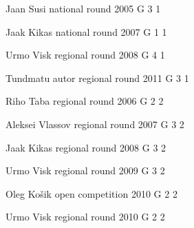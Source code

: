 \documentclass[11pt]{article}
\begin{document}
\ylDisplay{} %
{Jaan Susi} %
{national round} %
{2005} %
{G 3} %
{1} %
{

\ifEngSolution
\fi
}

\ylDisplay{} %
{Jaak Kikas} %
{national round} %
{2007} %
{G 1} %
{1} %
{

\ifEngSolution
\fi
}

\ylDisplay{} %
{Urmo Visk} %
{regional round} %
{2008} %
{G 4} %
{1} %
{

\ifEngSolution
\fi
}

\ylDisplay{} %
{Tundmatu autor} %
{regional round} %
{2011} %
{G 3} %
{1} %
{

\ifEngSolution
\fi
}

\ylDisplay{} %
{Riho Taba} %
{regional round} %
{2006} %
{G 2} %
{2} %
{

\ifEngSolution
\fi
}

\ylDisplay{} %
{Aleksei Vlassov} %
{regional round} %
{2007} %
{G 3} %
{2} %
{

\ifEngSolution
\fi
}

\ylDisplay{} %
{Jaak Kikas} %
{regional round} %
{2008} %
{G 3} %
{2} %
{

\ifEngSolution
\fi
}

\ylDisplay{} %
{Urmo Visk} %
{regional round} %
{2009} %
{G 3} %
{2} %
{

\ifEngSolution
\fi
}

\ylDisplay{} %
{Oleg Košik} %
{open competition} %
{2010} %
{G 2} %
{2} %
{

\ifEngSolution
\fi
}

\ylDisplay{} %
{Urmo Visk} %
{regional round} %
{2010} %
{G 2} %
{2} %
{

\ifEngSolution
\fi
}
\end{document}
